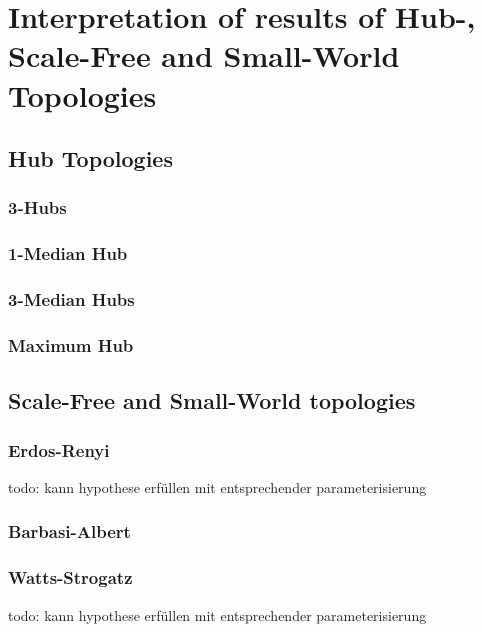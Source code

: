 \documentclass[Bachelorarbeit.tex]{subfiles}
\begin{document}
\chapter{Interpretation of results of Hub-, Scale-Free and Small-World Topologies}\label{app:interpretation}

\section{Hub Topologies}
\subsection{3-Hubs}
\subsection{1-Median Hub}
\subsection{3-Median Hubs}
\subsection{Maximum Hub}

\section{Scale-Free and Small-World topologies}
\subsection{Erdos-Renyi}
todo: kann hypothese erfüllen mit entsprechender parameterisierung
\subsection{Barbasi-Albert}
\subsection{Watts-Strogatz}
todo: kann hypothese erfüllen mit entsprechender parameterisierung
\end{document}
